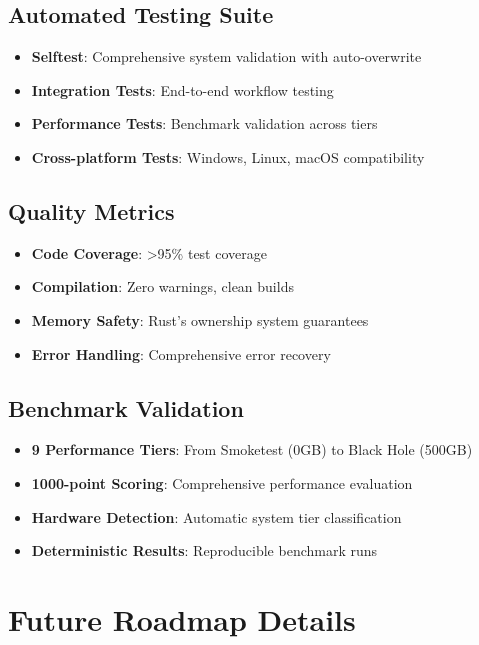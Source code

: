 \documentclass[12pt,a4paper]{article}
\begin{document}
\subsection{Automated Testing Suite}
\begin{itemize}
    \item \textbf{Selftest}: Comprehensive system validation with auto-overwrite
    \item \textbf{Integration Tests}: End-to-end workflow testing
    \item \textbf{Performance Tests}: Benchmark validation across tiers
    \item \textbf{Cross-platform Tests}: Windows, Linux, macOS compatibility
\end{itemize}

\subsection{Quality Metrics}
\begin{itemize}
    \item \textbf{Code Coverage}: >95\% test coverage
    \item \textbf{Compilation}: Zero warnings, clean builds
    \item \textbf{Memory Safety}: Rust's ownership system guarantees
    \item \textbf{Error Handling}: Comprehensive error recovery
\end{itemize}

\subsection{Benchmark Validation}
\begin{itemize}
    \item \textbf{9 Performance Tiers}: From Smoketest (0GB) to Black Hole (500GB)
    \item \textbf{1000-point Scoring}: Comprehensive performance evaluation
    \item \textbf{Hardware Detection}: Automatic system tier classification
    \item \textbf{Deterministic Results}: Reproducible benchmark runs
\end{itemize}

\newpage

\section{Future Roadmap Details}
\end{document}
